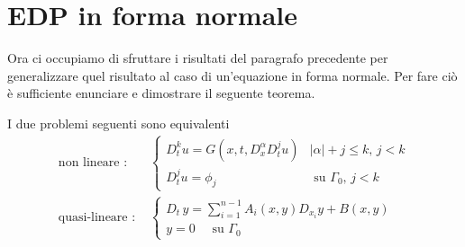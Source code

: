 \newpage
\section{EDP in forma normale}
Ora ci occupiamo di sfruttare i risultati del paragrafo precedente per generalizzare quel risultato al caso di un'equazione in forma normale. Per fare ciò è sufficiente enunciare e dimostrare il seguente teorema.
\begin{theorem}\label{teonorm}
I due problemi seguenti sono equivalenti
\begin{align*}
\text{non lineare : }&
\begin{cases}
D_{t}^k u = G(x,t, D^\alpha_x D^j_t u) & |\alpha |+ j \leq k, \, j<k \\
D_t^ju = \phi_j & \text{ su } \Gamma_0, \, j<k
\end{cases} \\
\text{quasi-lineare : }&
\begin{cases}
D_t \, y = \sum\limits_{i=1}^{n-1} A_i(x,y)D_{x_i}y+B(x,y) \; \\
y=0 \quad \text{ su } \Gamma_0
\end{cases}
\end{align*}
\end{theorem}

